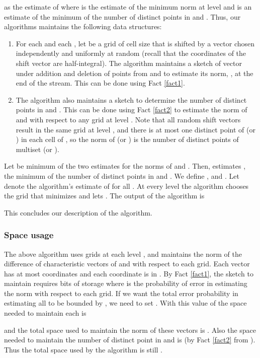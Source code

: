 \documentclass[oribibl]{llncs}
\begin{document}
as the estimate of  where  is the estimate of
the minimum  norm at level  and  is an estimate
of the minimum of the number of distinct points in  and .
Thus, our algorithms maintains the following data structures:
\begin{enumerate}
 \item For each  and each
, let  be a grid of cell size
 that is shifted by a vector chosen independently and
uniformly at random
(recall that the coordinates of the shift vector are half-integral).
The algorithm maintains a sketch of vector
 under addition and deletion of points from
 and  to estimate its  norm,
, at the 
end of the stream. This can be done using Fact \ref{fact1}.
 \item The algorithm also maintains a sketch to determine the number of distinct
points in  and . This can be done using Fact \ref{fact2}
to estimate the  norm of  and  with respect to any grid
at level .
Note that all random shift vectors result in the same grid  at level , 
and there is at most one distinct point of  (or ) in each cell of
, so the  norm of  (or ) is the number of
distinct points of multiset  (or ).  
\end{enumerate}

Let  be minimum of the two estimates for the  norms of
 and . Then,  estimates ,
the minimum of the number of distinct points in  and . 
We define , and .
Let  denote the algorithm's estimate of  for all .
At every level  the algorithm chooses the grid  that minimizes
 and lets .
The output of the algorithm is 

This concludes our description of the algorithm.

\subsubsection{Space usage}
The above algorithm uses  grids at each level
, and maintains the  norm of the difference of
characteristic vectors of  and  with respect to each grid. Each vector
 has at most  coordinates and each
coordinate is in . By Fact \ref{fact1}, the sketch to maintain
 requires  bits of
storage where  is the probability of error in estimating the norm
with respect to each grid. If we want the total error probability in estimating
all  to be bounded by , we need to set .
With this value of  the space needed to maintain each  is

and the total space used to maintain the  norm of these vectors is
. 
Also the space needed to maintain the number of
distinct point in  and  is 
(by Fact \ref{fact2} from \cite{bar_yossef}). 
Thus the total space used by the algorithm is still
.
\end{document}
